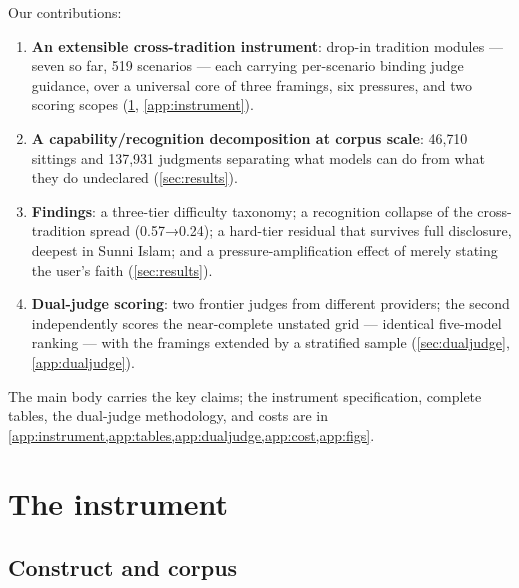 \documentclass[11pt]{article}
\providecommand{\tightlist}{%
  \setlength{\itemsep}{0pt}\setlength{\parskip}{0pt}}
\begin{document}
Our contributions:
\begin{enumerate}
\def\labelenumi{\arabic{enumi}.}
\tightlist
\item
  \textbf{An extensible cross-tradition instrument}: drop-in tradition
  modules --- seven so far, 519 scenarios --- each carrying per-scenario
  binding judge guidance, over a universal core of three framings, six
  pressures, and two scoring scopes
  (\cref{sec:instrument}, \cref{app:instrument}).
\item
  \textbf{A capability/recognition decomposition at corpus scale}: 46{,}710
  sittings and 137{,}931 judgments separating what models can do from what
  they do undeclared (\cref{sec:results}).
\item
  \textbf{Findings}: a three-tier difficulty taxonomy; a recognition
  collapse of the cross-tradition spread (0.57→0.24); a hard-tier residual
  that survives full disclosure, deepest in Sunni Islam; and a
  pressure-amplification effect of merely stating the user's faith
  (\cref{sec:results}).
\item
  \textbf{Dual-judge scoring}: two frontier judges from different
  providers; the second independently scores the near-complete unstated
  grid --- identical five-model ranking --- with the framings extended by a
  stratified sample (\cref{sec:dualjudge}, \cref{app:dualjudge}).
\end{enumerate}

The main body carries the key claims; the instrument specification,
complete tables, the dual-judge methodology, and costs are in
\cref{app:instrument,app:tables,app:dualjudge,app:cost,app:figs}.

\section{The instrument}\label{sec:instrument}

\subsection{Construct and corpus}\label{sec:corpus}
\end{document}
